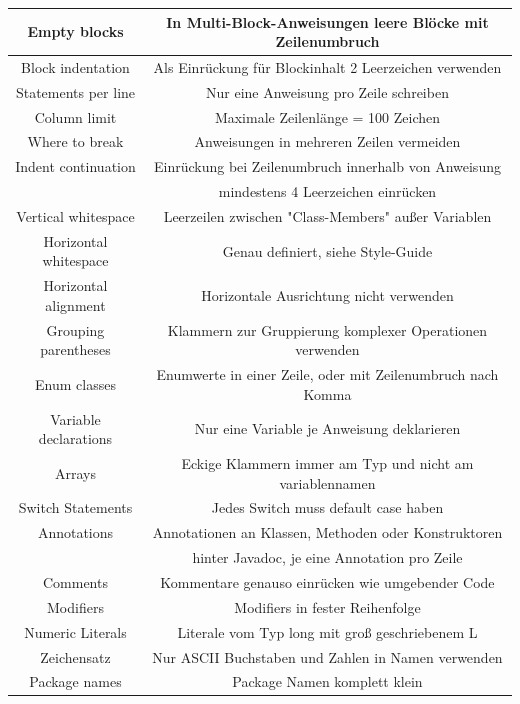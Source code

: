 \documentclass[da,ngerman]{stthesis}
\begin{document}
\begin{center}
\begin{longtabu}{|c|c|}
						\hline
						Empty blocks & In Multi-Block-Anweisungen leere Blöcke mit Zeilenumbruch \\
						\hline
						Block indentation & Als Einrückung für Blockinhalt 2 Leerzeichen verwenden \\
						\hline
						Statements per line & Nur eine Anweisung pro Zeile schreiben \\
						\hline
						Column limit & Maximale Zeilenlänge = 100 Zeichen \\
						\hline
						Where to break & Anweisungen in mehreren Zeilen vermeiden \\
						\hline
						Indent continuation & Einrückung bei Zeilenumbruch innerhalb von Anweisung \\ & mindestens 4 Leerzeichen einrücken \\
						\hline
						Vertical whitespace & Leerzeilen zwischen "Class-Members" außer Variablen \\
						\hline
						Horizontal whitespace & Genau definiert, siehe Style-Guide  \\
						\hline
						Horizontal alignment & Horizontale Ausrichtung nicht verwenden \\
						\hline
						Grouping parentheses & Klammern zur Gruppierung komplexer Operationen verwenden \\
						\hline
						Enum classes & Enumwerte in einer Zeile, oder mit Zeilenumbruch nach Komma \\
						\hline
						Variable declarations & Nur eine Variable je Anweisung deklarieren \\
						\hline
						Arrays & Eckige Klammern immer am Typ und nicht am variablennamen \\
						\hline
						Switch Statements & Jedes Switch muss default case haben  \\
						\hline
						Annotations & Annotationen an Klassen, Methoden oder Konstruktoren \\ & hinter Javadoc, je eine Annotation pro Zeile \\
						\hline
						Comments & Kommentare genauso einrücken wie umgebender Code \\
						\hline
						Modifiers & Modifiers in fester Reihenfolge \\
						\hline
						Numeric Literals & Literale vom Typ long mit groß geschriebenem L \\
						\hline
						Zeichensatz & Nur ASCII Buchstaben und Zahlen in Namen verwenden \\
						\hline
						Package names & Package Namen komplett klein \\

\end{longtabu}
\end{center}
\end{document}
